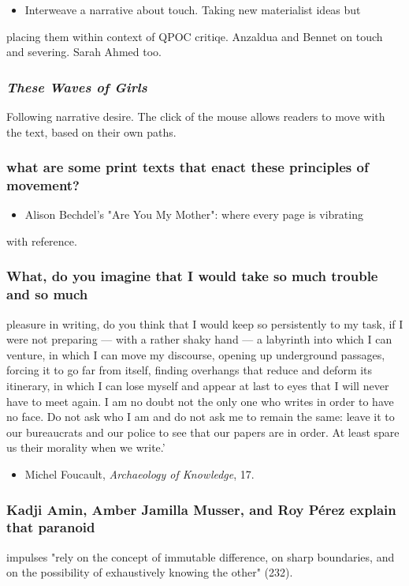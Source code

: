 \documentclass[11pt]{article}
\begin{document}
\begin{itemize}
\item Interweave a narrative about touch. Taking new materialist ideas but
\end{itemize}
placing them within context of QPOC critiqe. Anzaldua and Bennet on
touch and severing. Sarah Ahmed too. 

\subsubsection{\emph{These Waves of Girls}}
\label{sec:org548794c}
Following narrative desire. The click of the mouse allows readers to
move with the text, based on their own paths. 

\subsubsection{what are some print texts that enact these principles of movement?}
\label{sec:org0fcbd21}
\begin{itemize}
\item Alison Bechdel's "Are You My Mother": where every page is vibrating
\end{itemize}
with reference. 

\subsubsection{What, do you imagine that I would take so much trouble and so much}
\label{sec:org40dbdde}
pleasure in writing, do you think that I would keep so persistently to my task, if I were not preparing — with a rather shaky hand — a labyrinth into which I can venture, in which I can move my discourse, opening up underground passages, forcing it to go far from itself, finding overhangs that reduce and deform its itinerary, in which I can lose myself and appear at last to eyes that I will never have to meet again. I am no doubt not the only one who writes in order to have no face. Do not ask who I am and do not ask me to remain the same: leave it to our bureaucrats and our police to see that our papers are in order. At least spare us their morality when we write.’
\begin{itemize}
\item Michel Foucault, \emph{Archaeology of Knowledge}, 17.
\end{itemize}

\subsubsection{Kadji Amin, Amber Jamilla Musser, and Roy Pérez explain that paranoid}
\label{sec:org7307a08}
impulses "rely on the concept of immutable difference, on sharp
boundaries, and on the possibility of exhaustively knowing the other"
(232).
\end{document}
